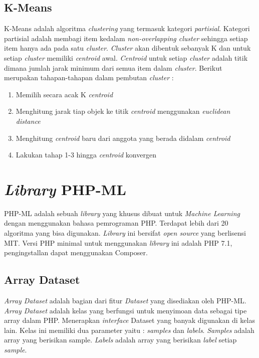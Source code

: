 \subsection{K-Means}
K-Means adalah algoritma \textit{clustering} yang termasuk kategori \textit{partisial}. Kategori partisial adalah membagi item kedalam \textit{non-overlapping cluster} sehingga setiap item hanya ada pada satu \textit{cluster}. \textit{Cluster} akan dibentuk sebanyak K dan untuk setiap \textit{cluster} memiliki \textit{centroid} awal. \textit{Centroid} untuk setiap \textit{cluster} adalah titik dimana jumlah jarak minimum dari semua item dalam \textit{cluster}. Berikut merupakan tahapan-tahapan dalam pembutan \textit{cluster} :
\begin{enumerate}
	\item Memilih secara acak K \textit{centroid}
	
	\item Menghitung jarak tiap objek ke titik \textit{centroid} menggunakan \textit{euclidean distance}
	
	\item Menghitung \textit{centroid} baru dari anggota yang berada didalam \textit{centroid}
	
	\item Lakukan tahap 1-3 hingga \textit{centroid} konvergen
\end{enumerate} 

\section{\textit{Library} PHP-ML}
\label{sec:library php-ml}
PHP-ML adalah sebuah \textit{library} yang khusus dibuat untuk \textit{Machine Learning} dengan menggunakan bahasa pemrograman PHP. Terdapat lebih dari 20 algoritma yang bisa digunakan. \textit{Library} ini bersifat \textit{open source} yang berlisensi MIT. Versi PHP minimal untuk menggunakan \textit{library} ini adalah PHP 7.1, pengingstallan dapat menggunakan Composer.

\subsection{Array Dataset} %
\textit{Array Dataset} adalah bagian dari fitur \textit{Dataset} yang disediakan oleh PHP-ML. \textit{Array Dataset} adalah kelas yang berfungsi untuk menyimoan data sebagai tipe array dalam PHP. Menerapkan \textit{interface} Dataset yang banyak digunakan di kelas lain. Kelas ini memiliki dua parameter yaitu : \textit{samples} dan \textit{labels}. \textit{Samples} adalah array yang berisikan sample. \textit{Labels} adalah array yang berisikan \textit{label} setiap \textit{sample}.

